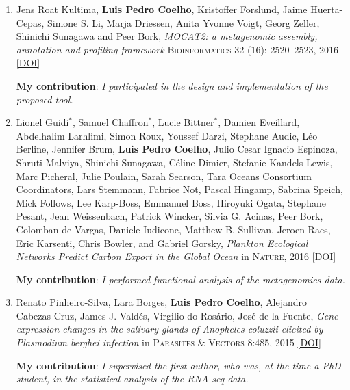 \documentclass{article}
\newcommand\showdoi[1]{%
    \href{http://dx.doi.org/#1}{[DOI]}%
}
\newcommand\pubname[1]{\textsc{#1}}
\newcommand\contribution[1]{\relax\hfill\break\textbf{My contribution}: \textit{#1}}
\begin{document}
\begin{enumerate}[resume]
\item Jens Roat Kultima, \textbf{Luis Pedro Coelho}, Kristoffer Forslund, Jaime
Huerta-Cepas, Simone S. Li, Marja Driessen, Anita Yvonne Voigt, Georg Zeller,
Shinichi Sunagawa and Peer Bork, \emph{MOCAT2: a metagenomic assembly,
annotation and profiling framework} \pubname{Bioinformatics} 32 (16):
2520--2523, 2016 \showdoi{10.1093/bioinformatics/btw183}
\contribution{I participated in the design and implementation of the proposed tool.}

\item Lionel Guidi${}^{*}$, Samuel Chaffron${}^{*}$, Lucie Bittner${}^{*}$,
Damien Eveillard, Abdelhalim Larhlimi, Simon Roux, Youssef Darzi, Stephane
Audic, Léo Berline, Jennifer Brum, \textbf{Luis Pedro Coelho}, Julio Cesar
Ignacio Espinoza, Shruti Malviya, Shinichi Sunagawa, Céline Dimier, Stefanie
Kandels-Lewis, Marc Picheral, Julie Poulain, Sarah Searson, Tara Oceans
Consortium Coordinators, Lars Stemmann, Fabrice Not, Pascal Hingamp, Sabrina
Speich, Mick Follows, Lee Karp-Boss, Emmanuel Boss, Hiroyuki Ogata, Stephane
Pesant, Jean Weissenbach, Patrick Wincker, Silvia G. Acinas, Peer Bork,
Colomban de Vargas, Daniele Iudicone, Matthew B. Sullivan, Jeroen Raes, Eric
Karsenti, Chris Bowler, and Gabriel Gorsky, \emph{Plankton Ecological Networks
Predict Carbon Export in the Global Ocean} in \pubname{Nature}, 2016
\showdoi{10.1038/nature16942}
\contribution{I performed functional analysis of the metagenomics data.}

\item Renato Pinheiro-Silva, Lara Borges, \textbf{Luis Pedro Coelho}, Alejandro
Cabezas-Cruz, James J. Valdés, Virgilio do Rosário, José de la Fuente,
\emph{Gene expression changes in the salivary glands of Anopheles coluzzii
elicited by Plasmodium berghei infection} in \pubname{Parasites \& Vectors}
8:485, 2015 \showdoi{10.1186/s13071-015-1079-8}
\contribution{I supervised the first-author, who was, at the time a PhD
student, in the statistical analysis of the RNA-seq data.}


\end{enumerate}
\end{document}
